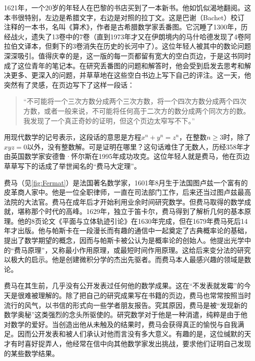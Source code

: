 \documentclass[b5paper]{ctexart}
\begin{document}
\begin{mdframed}

1621年，一个20岁的年轻人在巴黎的书店买到了一本新书。他如饥似渴地翻阅。这本书很特别，左边是希腊文字，右边是对照的拉丁文。这是巴谢（Bachet）校订注释的一本书，名叫《算术》，作者是古希腊数学家丢番图。它沉睡了1300年，历经战火，遗失了13卷中的7卷（直到1973年才又在伊朗境内的马什哈德发现了4卷阿拉伯文译本，但剩下的3卷消失在历史的长河中了）。这位年轻人被其中的数论问题深深吸引。值得庆幸的是，这一版的每一页都留有宽大的空白页边，于是这书同时成了这位青年的笔记本。在研究丢番图的问题和解答时，他会受到启发去思考和解决更多、更深入的问题，并草草地在这些空白书边上写下自己的评注。这一天，他突然有了灵感，在页边写下了这样一段话：

\begin{quotation}
“不可能将一个三次方数分成两个三次方数，将一个四次方数分成两个四次方数，或者一般来说，不可能将任何高于二次方的数分成两个同次方的数。我发现了一个真正奇妙的证明，但这个页边太窄写不下。”
\end{quotation}

用现代数学的记号表示，这段话的意思是方程$x^n + y^n = z^n$，在整数$n \geq 3$时，除了$xyz = 0$以外，没有整数解。可是证明在哪里？这句话难住了无数人，历经358年才由英国数学家安德鲁·怀尔斯在1995年成功攻克。这位年轻人就是费马，他在页边草草写下的话成了举世闻名的“费马大定理”。

费马（见\cref{fig:Fermat}）是法国著名数学家，1601年8月生于法国图卢兹一个富有的皮革商人家中。他是一位全职律师，一直在司法部门工作，后来还当过图卢兹最高法院的大法官。费马在成年后才开始利用业余时间研究数学。但费马取得的数学成就，堪称那个时代的高峰。1629年，独立于笛卡尔，费马得到了解析几何的基本原理。他的8页论文《平面与立体轨迹引论》在1630年完成，但在1679年费马死后14年才出版。他与帕斯卡在一段漫长而有趣的通信中一起奠定了古典概率论的基础，提出了数学期望的概念，因而与帕斯卡被公认为是概率论的创始人。他提出光学中的“费马原理”，又称最小作用原理，或最短时间作用原理。这给后来变分法的研究以极大的启示。他是创建微积分学的杰出先驱者。而费马本人最感兴趣的领域是数论。

费马在其生前，几乎没有公开发表过任何他的数学成果。这在“不发表就发霉”的今天是很难被理解的。除了把自己的研究成果写在书籍的页边，费马也常常按照当时流行的风气，以书信的形式向一些学者朋友报告。究其原因，费马是被“发现新的数学奥秘”这类强烈的念头所驱使的。研究数学对于他是一种消遣，纯粹是由于他对数学的爱好。当创造出他从未触及的结果时，费马会获得真正的愉悦与自我满足。因而公开发表和被人们承认对他而言没有多大意义\cite{HanXueTao2009}。有趣的是，这位缄默的天才有时喜好捉弄人，他经常在信中向其他数学家发出挑战，要求他们证明自己发现的某些数学结果。


\end{mdframed}
\end{document}
